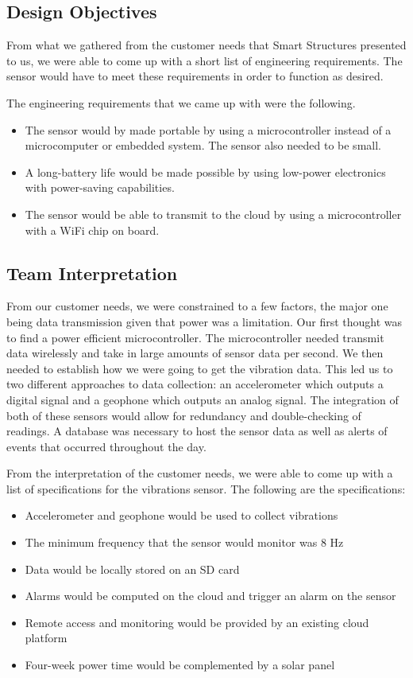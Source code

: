 \documentclass[11pt]{article}
\begin{document}
\subsection{Design Objectives}

From what we gathered from the customer needs that Smart Structures presented to us, we were able to come up with a short list of engineering requirements. The sensor would have to meet these requirements in order to function as desired.

The engineering requirements that we came up with were the following.
\begin{itemize}
\item The sensor would by made portable by using a microcontroller instead of a microcomputer or embedded system. The sensor also needed to be small.
\item A long-battery life would be made possible by using low-power electronics with power-saving capabilities.
\item The sensor would be able to transmit to the cloud by using a microcontroller with a WiFi chip on board.
\end{itemize}

\subsection{Team Interpretation}

From our customer needs, we were constrained to a few factors, the major one being data transmission given that power was a limitation. Our first thought was to find a power efficient microcontroller. The microcontroller needed transmit data wirelessly and take in large amounts of sensor data per second. We then needed to establish how we were going to get the vibration data. This led us to two different approaches to data collection: an accelerometer which outputs a digital signal and a geophone which outputs an analog signal. The integration of both of these sensors would allow for redundancy and double-checking of readings. A database was necessary to host the sensor data as well as alerts of events that occurred throughout the day.

From the interpretation of the customer needs, we were able to come up with a list of specifications for the vibrations sensor. The following are the specifications:

\begin{itemize}
\item Accelerometer and geophone would be used to collect vibrations
\item The minimum frequency that the sensor would monitor was 8 Hz
\item Data would be locally stored on an SD card
\item Alarms would be computed on the cloud and trigger an alarm on the sensor
\item Remote access and monitoring would be provided by an existing cloud platform
\item Four-week power time would be complemented by a solar panel
\end{itemize}
\end{document}
